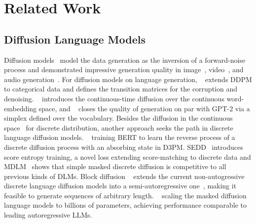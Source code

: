 \documentclass{article}
\begin{document}
\section{Related Work}
\subsection{Diffusion Language Models}
Diffusion models~\cite{ho2020ddpm,song2019generative} model the data generation as the inversion of a forward-noise process and demonstrated impressive generation quality in image~\cite{peebles2023dit}, video~\cite{videoworldsimulators2024sora}, and audio generation~\cite{Evans2024FastTL}. 
For diffusion models on language generation, ~\cite{hoogeboom2021argmax,austin2021structured} extends DDPM to categorical data and defines the transition matrices for the corruption and denoising. ~\cite{li2022diffusion} introduces the continuous-time diffusion over the continuous word-embedding space, and ~\cite{han2022ssd} closes the quality of generation on par with GPT-2 via a simplex defined over the vocabulary. Besides the diffusion in the continuous space~\cite{wu2023ar,ye2023dinoiser} for discrete distribution, another approach seeks the path in discrete language diffusion models. ~\cite{he2022diffusionbert} training BERT to learn the reverse process of a discrete diffusion process with an absorbing state in D3PM. 
SEDD~\cite{lou2023discrete} introduces score entropy training, a novel loss extending score-matching to discrete data and MDLM~\cite{sahoo2024simple} shows that simple masked discrete diffusion is competitive to all previous kinds of DLMs.
Block diffusion ~\cite{arriola2025block} extends the current non-autogressive~\cite{gu2017non} discrete language diffusion models into a semi-autoregressive one~\cite{han2022ssd,zhao2024pard}, making it feasible to generate sequences of arbitrary length. ~\cite{nie2025llada,gong2024scaling} scaling the masked diffusion language models to billions of parameters, achieving performance comparable to leading autoregressive LLMs.
\end{document}
